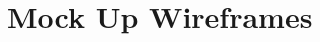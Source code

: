 \documentclass{article}
\begin{document}
\section{Mock Up Wireframes}


\begin{center}
\end{center}

\begin{center}
\end{center}

\begin{center}
\end{center}
\end{document}
